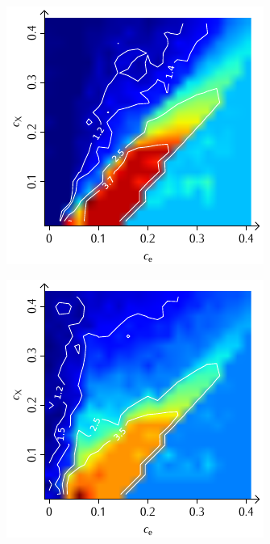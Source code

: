 \documentclass[a4paper, 10pt, twoside, openany]{book} %
\begin{document}
\begin{figure}
\begin{minipage}[t]{0.48\textwidth}
			\label{F_penalty_random_D}
		\end{minipage}
		\begin{minipage}[t]{0.48\textwidth}
			\includegraphics[width=\textwidth]{Abbildungen/Phasendiagramme/Konturen/F_individual_D.pdf}
			\label{F_individual_D}
		\end{minipage}
		\hfill
		\begin{minipage}[t]{0.48\textwidth}
			\includegraphics[width=\textwidth]{Abbildungen/Phasendiagramme/Konturen/F_penalty_individual_D.pdf}

\end{minipage}
\end{figure}
\end{document}
